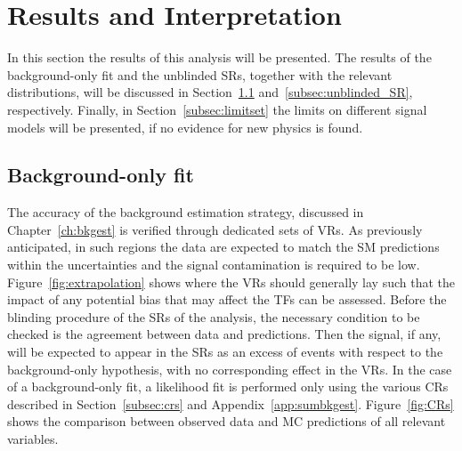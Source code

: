 	\section{Results and Interpretation}
	\label{sec:results}

		In this section the results of this analysis will be presented. The results of the background-only fit and the unblinded \acp{SR}, together with the relevant distributions, will be discussed in Section~\ref{subsec:bkgonly_fit} and~\ref{subsec:unblinded_SR}, respectively. Finally, in Section~\ref{subsec:limitset} the limits on different signal models will be presented, if no evidence for new physics is found.

 		\subsection{Background-only fit}
 		\label{subsec:bkgonly_fit}

 			The accuracy of the background estimation strategy, discussed in Chapter~\ref{ch:bkgest} is verified through dedicated sets of \acp{VR}. As previously anticipated, in such regions the data are expected to match the SM predictions within the uncertainties and the signal contamination is required to be low. Figure~\ref{fig:extrapolation} shows where the VRs should generally lay such that the impact of any potential bias that may affect the \acp{TF} can be assessed. Before the blinding procedure of the \acp{SR} of the analysis, the necessary condition to be checked is the agreement between data and predictions. Then the signal, if any, will be expected to appear in the \acp{SR} as an excess of events with respect to the background-only hypothesis, with no corresponding effect in the \acp{VR}. In the case of a background-only fit, a likelihood fit is performed only using the various \acp{CR} described in Section~\ref{subsec:crs} and Appendix~\ref{app:sumbkgest}. Figure~\ref{fig:CRs} shows the comparison between observed data and \ac{MC} predictions of all relevant variables.
		
